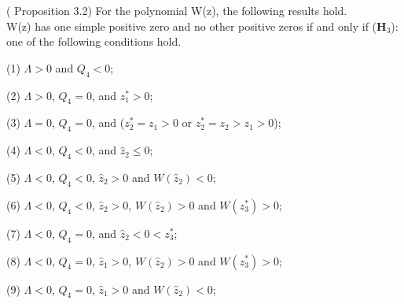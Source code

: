 \documentclass{CMHPhD-SIVD}
\begin{document}
\begin{lemma}\label{3.2} (\cite{wang2019hopf} Proposition 3.2) For the polynomial W(z), the following results hold.\\
W(z) has one simple positive zero and no other positive zeros if and only if ($\mathbf{H}_3$): one of the
following conditions hold.

(1) $\Lambda>0$ and $Q_4<0$;

(2) $\Lambda>0$, $Q_4=0$, and $z_1^*>0$;

(3) $\Lambda=0$, $Q_4=0$, and ($z_2^*=z_1>0$ or $z_2^*=z_2>z_1>0$);

(4) $\Lambda<0$, $Q_4<0$, and $\hat{z}_2\leq0$;

(5) $\Lambda<0$, $Q_4<0$, $\hat{z}_2>0$ and $W(\hat{z}_2)<0$;

(6) $\Lambda<0$, $Q_4<0$, $\hat{z}_2>0$, $W(\hat{z}_2)>0$ and $W(z_3^*)>0$;

(7) $\Lambda<0$, $Q_4=0$, and $\hat{z}_2<0<z_3^*$;

(8) $\Lambda<0$, $Q_4=0$, $\hat{z}_1>0$, $W(\hat{z}_2)>0$ and $W(z_3^*)>0$;

(9) $\Lambda<0$, $Q_4=0$, $\hat{z}_1>0$ and $W(\hat{z}_2)<0$;\\
%
%
%
%
%

%
%
%
%
%
%
%
%
%
%
%
%
%
\end{lemma}
\end{document}
